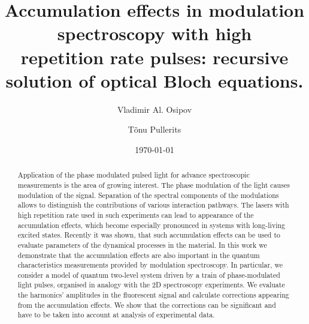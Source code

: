\documentclass[prb,twocolumn,showpacs,epsfig,epsf]{revtex4}
\newcommand{\1}{\mathds{1}}
\begin{document}
\title[Accumulation effects in modulation spectroscopy]{Accumulation effects in modulation  spectroscopy with high \\ repetition rate pulses: recursive solution of optical Bloch equations.}
\author{Vladimir Al. Osipov}
\author{T\~onu Pullerits}

\begin{abstract}
Application of the phase modulated pulsed light for advance spectroscopic measurements is the area of growing interest. The phase modulation of the light causes modulation of the signal.  Separation of the spectral components of the modulations allows to distinguish the contributions of various interaction pathways. The lasers with high repetition rate used in such experiments can lead to appearance of the accumulation effects, which become especially pronounced in systems with long-living excited states. Recently %
it was shown, that such accumulation effects can be used to evaluate parameters of the dynamical processes in the material. In this work we demonstrate that the accumulation effects are also important in the quantum characteristics measurements provided by modulation spectroscopy. In particular, we consider a model of quantum  two-level system driven by a train of phase-modulated light pulses, organised in analogy with the 2D spectroscopy experiments. We evaluate the harmonics' amplitudes in the fluorescent signal and calculate corrections appearing from the accumulation effects. We show that the corrections can be significant and have to be taken into account at analysis of experimental data. 
\end{abstract}
\date {\today}
\maketitle
\setlength{\textfloatsep}{20pt plus 4pt minus 4pt}
\setlength{\floatsep}{20pt plus 4pt minus 4pt}
\setlength{\columnsep}{9pt}
\end{document}

